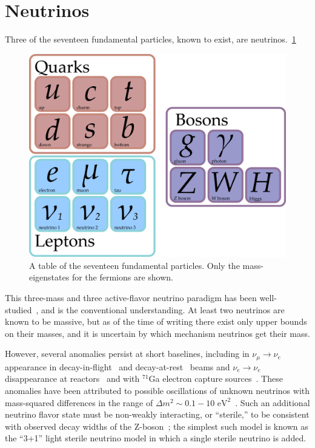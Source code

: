 \documentclass[main.tex]{subfiles}
\begin{document}
\section{Neutrinos}
Three of the seventeen fundamental particles, known to exist, are neutrinos.~\ref{fig:party}
\begin{figure}
    \centering
    \includegraphics[width=0.8\linewidth]{figures/particles.png}
    \caption{A table of the seventeen fundamental particles. Only the mass-eigenstates for the fermions are shown.}\label{fig:party}
\end{figure}
This three-mass and three active-flavor neutrino  paradigm has been well-studied~\cite{PhysRevD.98.030001,Esteban_2019,de_Salas_2018,Capozzi_2016,zboson2006, berns2021recent}, and is the conventional understanding.
At least two neutrinos are known to be massive, but as of the time of writing there exist only upper bounds on their masses, and it is uncertain by which mechanism neutrinos get their mass.

However, several anomalies persist at short baselines, including in $\nu_\mu\rightarrow\nu_e $ appearance in decay-in-flight~\cite{aguilar2018significant} and decay-at-rest~\cite{Athanassopoulos_1998} beams  and $\nu_e\rightarrow\nu_e$ disappearance at reactors~\cite{mention2011reactor,serebrov2019first}  and with $^{71}$Ga electron capture sources~\cite{PhysRevC.73.045805,giunti2011statistical}.  
These anomalies have been attributed to possible oscillations of unknown neutrinos with mass-squared differences in the range of $\Delta m^{2}\sim 0.1-10\text{ eV}^{2}$~\cite{abazajian2012light}.   
Such an additional neutrino flavor state must be non-weakly interacting, or ``sterile,'' to be consistent with observed decay widths of the Z-boson~\cite{zboson2006}; the simplest such model is known as the ``3+1'' light sterile neutrino model in which a single sterile neutrino is added. 
\end{document}

